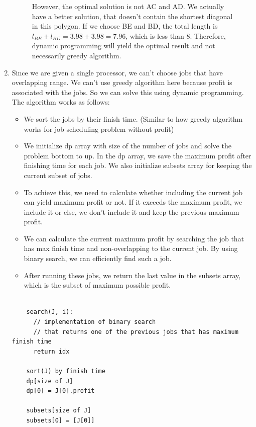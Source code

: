 \documentclass{article}
\begin{document}
\begin{enumerate}
\begin{figure}[H]
\begin{minipage}{0.4\textwidth}
      \caption{However, the optimal solution is not AC and AD.
      We actually have a better solution, that doesn't contain the shortest diagonal in this polygon.
      If we choose BE and BD, the total length is $l_{BE}+l_{BD}=3.98+3.98=7.96$, which is less than 8.
      Therefore, dynamic programming will yield the optimal result and not necessarily greedy algorithm.}
    \end{minipage}
  \end{figure}

  \item Since we are given a single processor, we can't choose jobs that have overlapping range.
  We can't use greedy algorithm here because profit is associated with the jobs.
  So we can solve this using dynamic programming.
  The algorithm works as follows:
  \begin{itemize}
    \item We sort the jobs by their finish time.
    (Similar to how greedy algorithm works for job scheduling problem without profit)
    \item We initialize dp array with size of the number of jobs and solve the problem bottom to up.
    In the dp array, we save the maximum profit after finishing time for each job.
    We also initialize subsets array for keeping the current subset of jobs.
    \item To achieve this, we need to calculate whether including the current job can yield maximum profit or not.
    If it exceeds the maximum profit, we include it or else, we don't include it and keep the previous maximum profit.
    \item We can calculate the current maximum profit by searching the job that has max finish time and non-overlapping to the current job.
    By using binary search, we can efficiently find such a job.
    \item After running these jobs, we return the last value in the subsets array, which is the subset of maximum possible profit.
  \end{itemize}

  \begin{lstlisting}

    search(J, i):
      // implementation of binary search
      // that returns one of the previous jobs that has maximum finish time
      return idx

    sort(J) by finish time
    dp[size of J]
    dp[0] = J[0].profit

    subsets[size of J]
    subsets[0] = [J[0]]


\end{lstlisting}
\end{enumerate}
\end{document}
